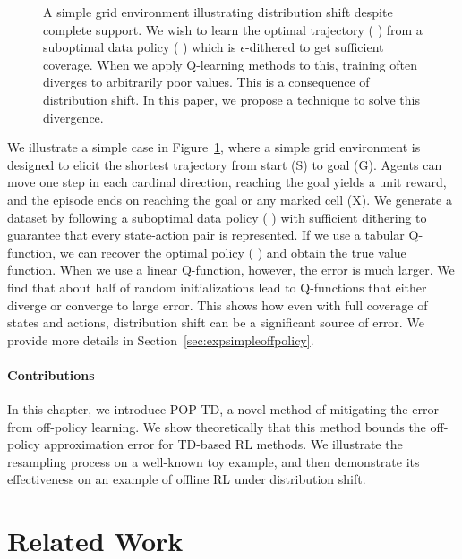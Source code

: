 \begin{figure}[t]
  \centering
  
  \caption{A simple grid environment illustrating distribution shift despite complete support. We wish to learn the optimal trajectory ({\color{optimpolicy} \optimpolicyglyph}) from a suboptimal data policy ({\color{datapolicy} \datapolicyglyph}) which is $\epsilon$-dithered to get sufficient coverage. When we apply Q-learning methods to this, training often diverges to arbitrarily poor values. This is a consequence of distribution shift. In this paper, we propose a technique to solve this divergence. }
  \label{fig:sopmap}
\end{figure}

We illustrate a simple case in Figure~\ref{fig:sopmap}, where a simple grid environment is designed to elicit the shortest trajectory from start (S) to goal (G). Agents can move one step in each cardinal direction, reaching the goal yields a unit reward, and the episode ends on reaching the goal or any marked cell (X). We generate a dataset by following a suboptimal data policy ({\color{datapolicy} \datapolicyglyph}) with sufficient dithering to guarantee that every state-action pair is represented. If we use a tabular Q-function, we can recover the optimal policy ({\color{optimpolicy} \optimpolicyglyph}) and obtain the true value function. When we use a linear Q-function, however, the error is much larger. We find that about half of random initializations lead to Q-functions that either diverge or converge to large error. This shows how even with full coverage of states and actions, distribution shift can be a significant source of error. We provide more details in Section~\ref{sec:expsimpleoffpolicy}.

\paragraph{Contributions}
In this chapter, we introduce POP-TD, a novel method of mitigating the error from off-policy learning. We show theoretically that this method bounds the off-policy approximation error for TD-based RL methods. We illustrate the resampling process on a well-known toy example, and then demonstrate its effectiveness on an example of offline RL under distribution shift.

\section{Related Work}

